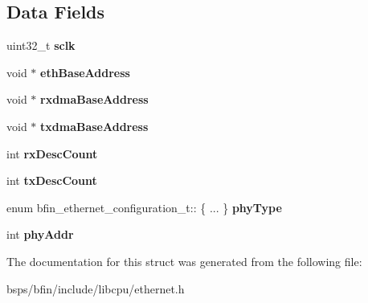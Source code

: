\subsection*{Data Fields}
\begin{DoxyCompactItemize}
\item 
\mbox{\label{structbfin__ethernet__configuration__t_adca3d2e6df846e3def412e76aa2df63c}} 
uint32\+\_\+t {\bfseries sclk}
\item 
\mbox{\label{structbfin__ethernet__configuration__t_a4ba51d79f9bf4e1b802798f593e588a2}} 
void $\ast$ {\bfseries eth\+Base\+Address}
\item 
\mbox{\label{structbfin__ethernet__configuration__t_abdeabbba5fa4f8413bd15fe1abd33420}} 
void $\ast$ {\bfseries rxdma\+Base\+Address}
\item 
\mbox{\label{structbfin__ethernet__configuration__t_ab9c8e6f6efa5dd49a9cc487fc3a8249c}} 
void $\ast$ {\bfseries txdma\+Base\+Address}
\item 
\mbox{\label{structbfin__ethernet__configuration__t_a0257b63a7baaa3cb94aeee9681524c8e}} 
int {\bfseries rx\+Desc\+Count}
\item 
\mbox{\label{structbfin__ethernet__configuration__t_ac8842fd2168d7c7def8ab5890f91e700}} 
int {\bfseries tx\+Desc\+Count}
\item 
\mbox{\label{structbfin__ethernet__configuration__t_a48323e30cd999923380139aebdb88db6}} 
enum bfin\+\_\+ethernet\+\_\+configuration\+\_\+t\+:: \{ ... \}  {\bfseries phy\+Type}
\item 
\mbox{\label{structbfin__ethernet__configuration__t_a067fed3c9da769f8e283d9983d3e30a2}} 
int {\bfseries phy\+Addr}
\end{DoxyCompactItemize}


The documentation for this struct was generated from the following file\+:\begin{DoxyCompactItemize}
\item 
bsps/bfin/include/libcpu/ethernet.\+h\end{DoxyCompactItemize}
